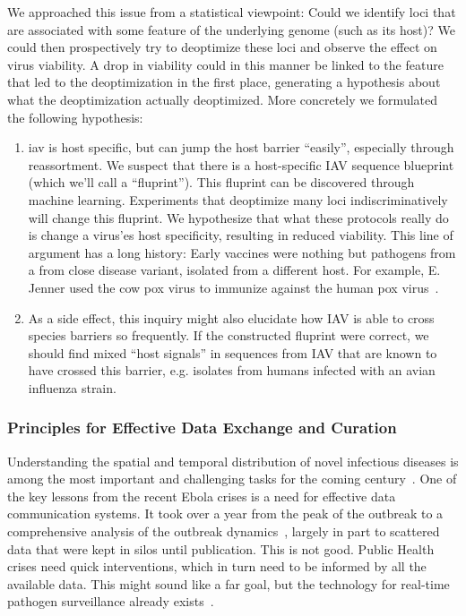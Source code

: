 We approached this issue from a statistical viewpoint: Could we identify loci that are associated with some feature of the underlying genome (such as its host)? We could then prospectively try to deoptimize these loci and observe the effect on virus viability. A drop in viability could in this manner be linked to the feature that led to the deoptimization in the first place, generating a hypothesis about what the deoptimization actually deoptimized. More concretely we formulated the following hypothesis:


\begin{enumerate}[label=(\alph*)]
    \item \gls{iav} is host specific, but can jump the host barrier ``easily'', especially through reassortment. We suspect that there is a host-specific IAV sequence blueprint (which we'll call a ``fluprint''). This fluprint can be discovered through machine learning. Experiments that deoptimize many loci indiscriminatively will change this fluprint. We hypothesize that what these protocols really do is change a virus'es host specificity, resulting in reduced viability. This line of argument has a long history: Early vaccines were nothing but pathogens from a from close disease variant, isolated from a different host. For example, E. Jenner used the cow pox virus to immunize against the human pox virus~\cite{Riedel2005-pt}.
    \item As a side effect, this inquiry might also elucidate how IAV is able to cross species barriers so frequently. If the constructed fluprint were correct, we should find mixed ``host signals'' in sequences from IAV that are known to have crossed this barrier, e.g. isolates from humans infected with an avian influenza strain.
\end{enumerate}


\subsubsection{Principles for Effective Data Exchange and Curation}

Understanding the spatial and temporal distribution of novel infectious diseases is among the most important and challenging tasks for the coming century~\cite{Smith2014-km}. One of the key lessons from the recent Ebola crises is a need for effective data communication systems. It took over a year from the peak of the outbreak to a comprehensive analysis of the outbreak dynamics~\cite{Dudas2017-ku}, largely in part to scattered data that were kept in silos until publication. This is not good. Public Health crises need quick interventions, which in turn need to be informed by all the available data. This might sound like a far goal, but the technology for real-time pathogen surveillance already exists~\cite{Schatz2012-ju, Gardy2015-ta}.


